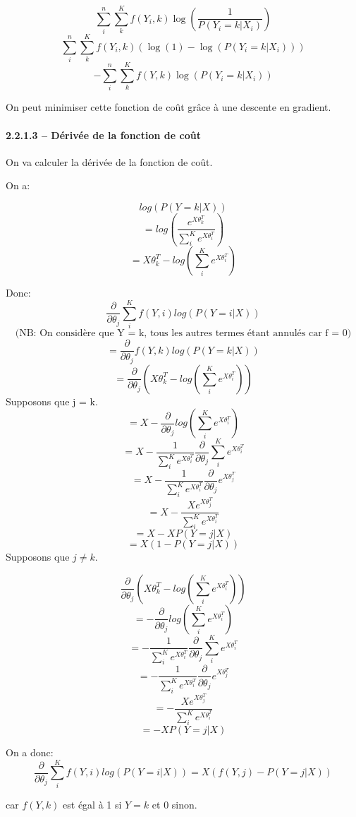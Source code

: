 \documentclass[
]{article}
\begin{document}
\[\sum_i^n \sum_k^K f(Y_i, k) \log(\frac{1}{P(Y_i = k | X_i)})\]
\[\sum_i^n \sum_k^K f(Y_i, k) (\log(1) - \log(P(Y_i = k | X_i)))\]
\[-\sum_i^n \sum_k^K f(Y, k)\log(P(Y_i = k | X_i))\]

On peut minimiser cette fonction de coût grâce à une descente en
gradient.

\hypertarget{duxe9rivuxe9e-de-la-fonction-de-couxfbt}{%
\paragraph{2.2.1.3 -- Dérivée de la fonction de
coût}\label{duxe9rivuxe9e-de-la-fonction-de-couxfbt}}

On va calculer la dérivée de la fonction de coût.

On a:

\[log(P(Y = k | X))\]
\[=log\left(\frac{e^{X \theta_k^T}}{\sum_i^K e^{X\theta_i^T}}\right)\]
\[=X \theta_k^T - log\left(\sum_i^K e^{X \theta_i^T}\right)\]

Donc:
\[\frac{\partial}{\partial \theta_{j}} \sum_i^K f(Y, i)log(P(Y = i | X))\]
\[\text{(NB: On considère que Y = k, tous les autres termes étant annulés car f = 0)}\]
\[=\frac{\partial}{\partial \theta_{j}} f(Y, k)log(P(Y = k | X))\]
\[=\frac{\partial}{\partial \theta_{j}} \left(X \theta_{k}^T - log\left(\sum_i^K e^{X \theta_i^T}\right)\right) \]
Supposons que j = k.
\[=X - \frac{\partial}{\partial \theta_{j}}log\left(\sum_i^K e^{X \theta_i^T}\right) \]
\[=X - \frac{1}{\sum_i^K e^{X \theta_i^T}} \frac{\partial}{\partial \theta_{j}}\sum_i^K e^{X \theta_i^T} \]
\[=X - \frac{1}{\sum_i^K e^{X \theta_i^T}} \frac{\partial}{\partial \theta_{j}}e^{X \theta_j^T}\]
\[=X - \frac{X e^{X \theta_j^T}}{\sum_i^K e^{X \theta_i^T}}\]
\[=X - X P(Y = j | X)\] \[=X (1 - P(Y = j | X))\] Supposons que
\(j \neq k\).

\[\frac{\partial}{\partial \theta_{j}} \left(X \theta_{k}^T - log\left(\sum_i^K e^{X \theta_i^T}\right)\right) \]
\[= - \frac{\partial}{\partial \theta_{j}}log\left(\sum_i^K e^{X \theta_i^T}\right) \]
\[= - \frac{1}{\sum_i^K e^{X \theta_i^T}} \frac{\partial}{\partial \theta_{j}}\sum_i^K e^{X \theta_i^T} \]
\[= - \frac{1}{\sum_i^K e^{X \theta_i^T}} \frac{\partial}{\partial \theta_{j}}e^{X \theta_j^T} \]
\[= - \frac{Xe^{X \theta_j^T}}{\sum_i^K e^{X \theta_i^T}} \]
\[= -X P(Y = j | X)\]

On a donc:
\[\frac{\partial}{\partial \theta_{j}} \sum_i^K f(Y, i)log(P(Y = i | X)) = X(f(Y, j) - P(Y = j|X))\]

car \(f(Y, k)\) est égal à 1 si \(Y = k\) et 0 sinon.
\end{document}
